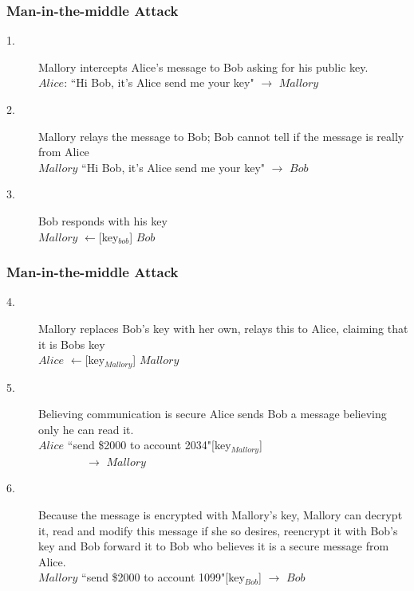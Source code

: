 \documentclass{beamer}
\begin{document}
		\begin{frame}
	\frametitle{Man-in-the-middle Attack}
		\begin{description}
	\item[1.] Mallory intercepts Alice's message to Bob asking for his public key.\hfill\\
	$Alice$: ``Hi Bob, it's Alice send me your key" $\rightarrow$ $Mallory$
	\item[2.] Mallory relays the message to Bob; Bob cannot tell if the message is really from Alice \hfill\\
	 $Mallory$ ``Hi Bob, it's Alice send me your key" $\rightarrow$ $Bob$ 	
	\item[3.]Bob responds with his key \hfill\\
	$Mallory$ $\leftarrow$[key$_{bob}$]  $Bob$
	\end{description}
	\end{frame}
	\begin{frame}
	\frametitle{Man-in-the-middle Attack}
	\begin{description}
	
	\item[4.] Mallory replaces Bob's key with her own, relays this to  Alice, claiming that it is Bobs key\hfill\\
	$Alice$ $\leftarrow$[key$_{Mallory}$] $Mallory$
	\item[5.]
	Believing communication is secure Alice sends Bob a message believing only he can read it. \hfill\\
	$Alice$ ``send \$2000 to account 2034"[key$_{Mallory}$] \\
	$~\quad\quad\quad\quad\rightarrow$ $Mallory$
	\item[6.] Because the message is encrypted with Mallory's key, Mallory can decrypt it, read and modify this message if she so desires, reencrypt it with Bob's key and Bob forward it to Bob who believes it is a secure message from Alice. \hfill\\
	$Mallory$ ``send \$2000 to account 1099"[key$_{Bob}$] $\rightarrow$ $Bob$
	\end{description}	
\end{frame}
\end{document}
